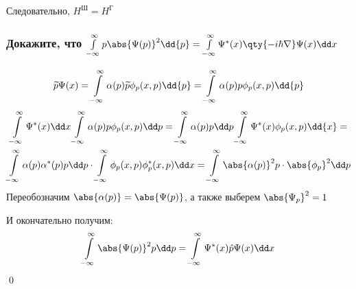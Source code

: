 Следовательно, $H^{\text{Ш}}=H^{\text{Г}}$

\subsubsection{Докажите, что $\infint p \abs{\Psi(p)}^2\dd{p}=\infint\Psi^*(x)\qty{-i\hbar\nabla}\Psi(x)\dd x$}

{}

$$\tilde p\Psi(x)=\infint \alpha(p)\tilde p \phi_p(x,p)\dd{p}=\infint\alpha(p) p\phi_p(x,p)\dd{p}$$
\begin{gather*}
	\infint \Psi^*(x)\dd x\infint \alpha(p) p \phi_p(x,p)\dd p=
	\infint \alpha(p)p\dd p \infint \Psi^* (x) \phi_p(x,p) \dd{x}=
	\\
	\infint \alpha(p) \alpha^*(p) p \dd p \cdot \infint \phi_p(x,p) \phi^*_p(x,p) \dd x=\infint \abs{\alpha(p)}^2 p\cdot \abs{\phi_p}^2 \dd p
\end{gather*}
Переобозначим $\abs{\alpha(p)}=\abs{\Psi(p)}$, а также выберем $\abs{\Psi_p}^2=1$

И окончательно получим:
$$\infint \abs{\Psi(p)}^2 p \dd p = \infint \Psi^*(x) \hat p \Psi(x) \dd x $$
\qed
